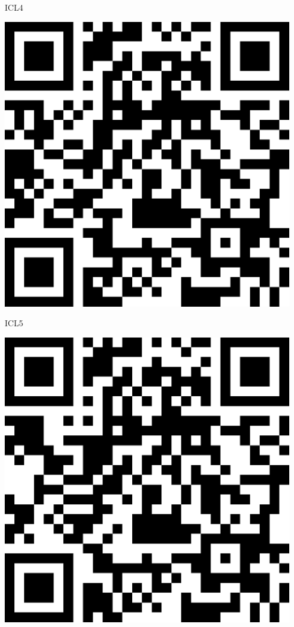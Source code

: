\documentclass[letterpaper]{article}
\begin{document}
 \hfill{\small ICL4} 

 \vspace{1in} 
 \pagebreak 
{} 
 \vspace*{\fill} 
 \begingroup 
 \centerline{\includegraphics[scale=1,width=5in,height=5in]{ICL5.png}} 
 \endgroup 
 \vspace*{\fill} 

 \hfill{\small ICL5} 

 \vspace{1in} 
 \pagebreak 
{} 
 \vspace*{\fill} 
 \begingroup 
 \centerline{\includegraphics[scale=1,width=5in,height=5in]{ICL6.png}} 
 \endgroup 
 \vspace*{\fill} 
\end{document}
